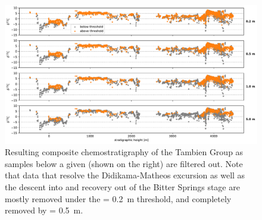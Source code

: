\begin{figure}[h!]
\begin{center}
	\includegraphics[width=\textwidth]{figures/Tambien/siliciclastic-filtering-comparison.pdf}
	\caption[Resulting composite chemostratigraphy of the Tambien Group as samples below a given \dsil are filtered out.]{Resulting composite chemostratigraphy of the Tambien Group as samples below a given \dsil (shown on the right) are filtered out. Note that data that resolve the Didikama-Matheos excursion as well as the descent into and recovery out of the Bitter Springs stage are mostly removed under the \dsil = 0.2~m threshold, and completely removed by \dsil = 0.5~m.}
	\label{fig:siliciclastic-filtering-comparison}
\end{center}
\end{figure}

